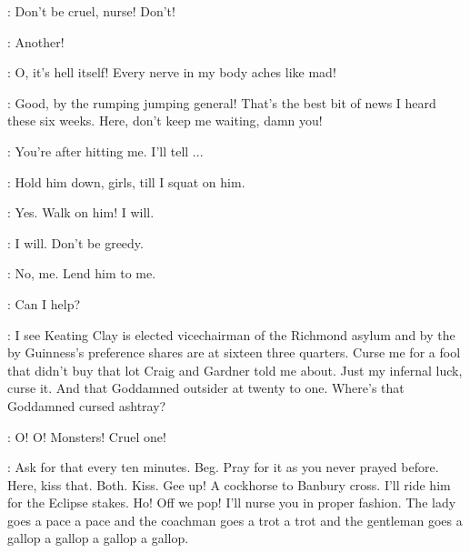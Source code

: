 \Bloom:
Don't be cruel, nurse!
Don't!

\Bello:
Another!

\Bloom:
O, it's hell itself!
Every nerve in my body aches like mad!

\Bello:
Good, by the rumping jumping general!
That's the best bit of news I heard these six weeks.
Here, don't keep me waiting, damn you!

\Bloom:
You're after hitting me.
I'll tell ...

\Bello:
Hold him down, girls, till I squat on him.

\Zoe:
Yes.
Walk on him!
I will.

\Florry:
I will.
Don't be greedy.

\Kitty:
No, me.
Lend him to me.


\MrsKeogh:
Can I help?

\Bello:
I see Keating Clay is elected vicechairman of the Richmond asylum
and by the by Guinness's preference shares are at sixteen three quarters.
Curse me for a fool that didn't buy that lot Craig and Gardner told me about.
Just my infernal luck, curse it.
And that Goddamned outsider  at twenty to one.
Where's that Goddamned cursed ashtray?

\Bloom:
O! O!
Monsters!
Cruel one!

\Bello:
Ask for that every ten minutes. Beg.
Pray for it as you never prayed before.
Here, kiss that.
Both. Kiss.
Gee up!
A cockhorse to Banbury cross.
I'll ride him for the Eclipse stakes.
Ho! Off we pop!
I'll nurse you in proper fashion.
The lady goes a pace a pace and the coachman goes a trot a trot
and the gentleman goes a gallop a gallop a gallop a gallop.

